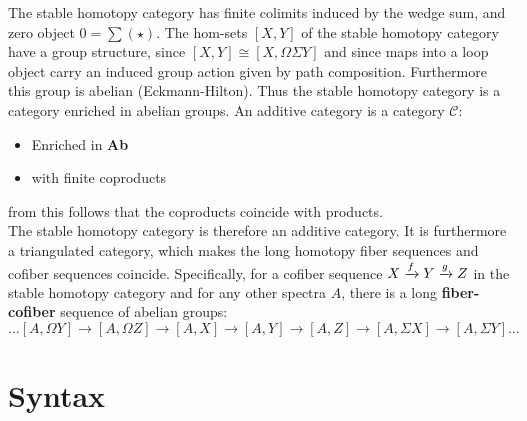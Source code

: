 The stable homotopy category has finite colimits induced by the wedge sum, and zero object $0=\sum(\star)$. The hom-sets $[X, Y]$ of the stable homotopy category have a group structure, since $[X, Y] \cong [X, \Omega \Sigma Y]$ and since maps into a loop object carry an induced group action given by path composition. Furthermore this group is abelian (Eckmann-Hilton). Thus the stable homotopy category is a category enriched in abelian groups.
An additive category is a category $\mathcal{C}$:
\begin{itemize}
\item Enriched in \textbf{Ab}
\item with finite coproducts
\end{itemize}
from this follows that the coproducts coincide with products.\\
The stable homotopy category is therefore an additive category.
It is furthermore a triangulated category, which makes the long homotopy fiber sequences and cofiber sequences coincide. Specifically, for a cofiber sequence $X \xrightarrow{f} Y \xrightarrow{g} Z$ in the stable homotopy category and for any other spectra $A$, there is a long \textbf{fiber-cofiber} sequence of abelian groups:
\[
\dots [A, \Omega Y] \to [A, \Omega Z] \to [A, X] \to [A, Y] \to [A, Z] \to [A, \Sigma X] \to [A, \Sigma Y] \dots
\]
\newpage

\section{Syntax}

